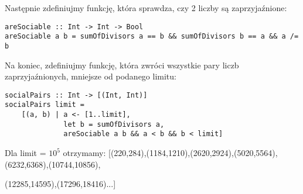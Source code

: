 \documentclass[11pt,a4paper]{article}
\begin{document}
Następnie zdefiniujmy funkcję, która sprawdza, czy 2 liczby są zaprzyjaźnione:
\begin{verbatim}
areSociable :: Int -> Int -> Bool
areSociable a b = sumOfDivisors a == b && sumOfDivisors b == a && a /= b
\end{verbatim}

Na koniec, zdefiniujmy funkcję, która zwróci wszystkie pary liczb zaprzyjaźnionych, mniejsze od podanego limitu:
\begin{verbatim}
socialPairs :: Int -> [(Int, Int)]
socialPairs limit =
    [(a, b) | a <- [1..limit],
              let b = sumOfDivisors a,
              areSociable a b && a < b && b < limit]
\end{verbatim}

Dla limit = $10^5$ otrzymamy:
[(220,284),(1184,1210),(2620,2924),(5020,5564),(6232,6368),(10744,10856), \par (12285,14595),(17296,18416)...]

\bigskip
\end{document}
